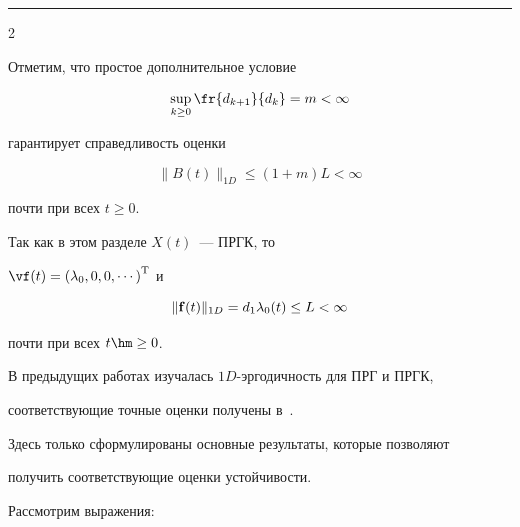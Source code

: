 \vspace*{6pt}



\hrule



\begin{multicols}{2}



\noindent

Отметим, что простое дополнительное условие

\begin{equation*}

\sup\limits_{k \ge 0} \fr{d_{k+1}}{d_k} = m < \infty


\end{equation*}

гарантирует справедливость оценки

\begin{equation*}

\|B(t)\|_{1D} \le \left(1+m\right)L < \infty


\end{equation*}

почти при всех $t \ge 0$.

Так как в этом разделе $X(t)$~--- ПРГК, то

$\vf(t)=\left(\lambda_{0}, 0,0, \cdots \right)^{\mathrm{T}}$ и

\begin{equation*}

\|{\bf f}(t)\|_{1D} = d_1 \lambda_0(t) \le L < \infty


\end{equation*}

почти при всех  $t \hm\ge 0$.



\medskip



В предыдущих работах изучалась $1D$-эр\-го\-дич\-ность для ПРГ и ПРГК,

соответствующие точные оценки получены в~\cite{z91, z95, z12, z13a}.

Здесь только сформулированы основные результаты, которые позволяют

получить соответствующие оценки устойчивости.



Рассмотрим выражения:

\begin{multline*}


\end{multline*}
\end{multicols}
